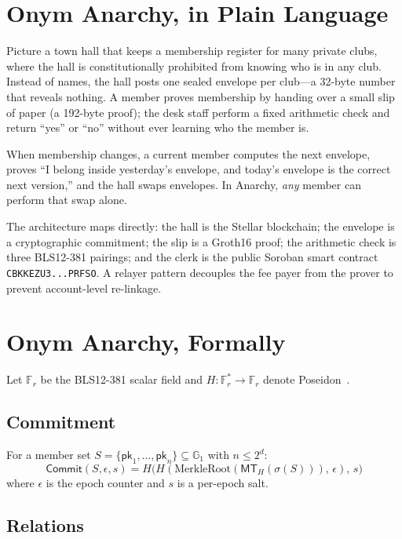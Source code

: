 \documentclass[journal]{IEEEtran}
\newcommand{\FF}{\mathbb{F}_r}
\newcommand{\GG}{\mathbb{G}}
\newcommand{\Commit}{\mathsf{Commit}}
\newcommand{\MT}{\mathsf{MT}}
\newcommand{\pk}{\mathsf{pk}}
\begin{document}
\section{Onym Anarchy, in Plain Language}

Picture a town hall that keeps a membership register for many private clubs, where the hall is constitutionally prohibited from knowing who is in any club. Instead of names, the hall posts one sealed envelope per club---a 32-byte number that reveals nothing. A member proves membership by handing over a small slip of paper (a 192-byte proof); the desk staff perform a fixed arithmetic check and return ``yes'' or ``no'' without ever learning who the member is.

When membership changes, a current member computes the next envelope, proves ``I belong inside yesterday's envelope, and today's envelope is the correct next version,'' and the hall swaps envelopes. In Anarchy, \emph{any} member can perform that swap alone.

The architecture maps directly: the hall is the Stellar blockchain; the envelope is a cryptographic commitment; the slip is a Groth16 proof; the arithmetic check is three BLS12-381 pairings; and the clerk is the public Soroban smart contract \texttt{CBKKEZU3...PRFSO}. A relayer pattern decouples the fee payer from the prover to prevent account-level re-linkage.

\section{Onym Anarchy, Formally}

Let $\FF$ be the BLS12-381 scalar field and $H\colon \FF^* \to \FF$ denote Poseidon~\cite{grassi2021poseidon}.

\subsection{Commitment}

For a member set $S = \{\pk_1, \ldots, \pk_n\} \subseteq \GG_1$ with $n \leq 2^d$:
\begin{equation}
\Commit(S, \epsilon, s) = H\bigl(H(\text{MerkleRoot}(\MT_H(\sigma(S))),\, \epsilon),\, s\bigr)
\end{equation}
where $\epsilon$ is the epoch counter and $s$ is a per-epoch salt.

\subsection{Relations}
\end{document}
